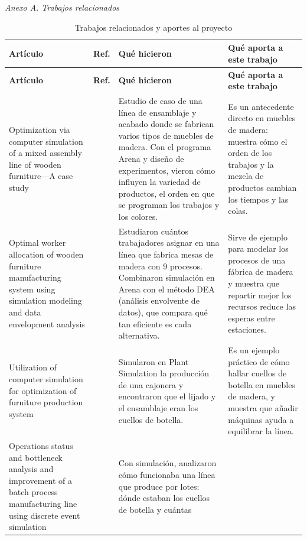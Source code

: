 \documentclass[conference,a4paper]{IEEEtran}
\begin{document}
\noindent\textit{Anexo A. Trabajos relacionados}

\setcounter{table}{0}
\renewcommand{\thetable}{A\arabic{table}}
\renewcommand{\arraystretch}{1.15}
\setlength{\tabcolsep}{3pt}
{\scriptsize
\begin{longtable}{|L{4.2cm}|C{1.0cm}|L{6.3cm}|L{5.4cm}|}
\caption{Trabajos relacionados y aportes al proyecto}\label{tab:a1}\\
\hline
\textbf{Artículo} & \textbf{Ref.} & \textbf{Qué hicieron} &
\textbf{Qué aporta a este trabajo} \\ \hline
\endfirsthead
\hline
\textbf{Artículo} & \textbf{Ref.} & \textbf{Qué hicieron} &
\textbf{Qué aporta a este trabajo} \\ \hline
\endhead
Optimization via computer simulation of a mixed assembly line of wooden furniture---A case
study & \cite{nouri2019} & Estudio de caso de una línea de ensamblaje y acabado donde se
fabrican varios tipos de muebles de madera. Con el programa Arena y diseño de experimentos,
vieron cómo influyen la variedad de productos, el orden en que se programan los trabajos y
los colores. & Es un antecedente directo en muebles de madera: muestra cómo el orden de los
trabajos y la mezcla de productos cambian los tiempos y las colas. \\ \hline
Optimal worker allocation of wooden furniture manufacturing system using simulation modeling
and data envelopment analysis & \cite{matrani2026} & Estudiaron cuántos trabajadores asignar
en una línea que fabrica mesas de madera con 9 procesos. Combinaron simulación en Arena con
el método DEA (análisis envolvente de datos), que compara qué tan eficiente es cada
alternativa. & Sirve de ejemplo para modelar los procesos de una fábrica de madera y muestra
que repartir mejor los recursos reduce las esperas entre estaciones. \\ \hline
Utilization of computer simulation for optimization of furniture production system &
\cite{bambura2020} & Simularon en Plant Simulation la producción de una cajonera y
encontraron que el lijado y el ensamblaje eran los cuellos de botella. & Es un ejemplo
práctico de cómo hallar cuellos de botella en muebles de madera, y muestra que añadir
máquinas ayuda a equilibrar la línea. \\ \hline
Operations status and bottleneck analysis and improvement of a batch process manufacturing
line using discrete event simulation & \cite{velumani2017} & Con simulación, analizaron cómo
funcionaba una línea que produce por lotes: dónde estaban los cuellos de botella y cuántas

\end{longtable}}
\end{document}
